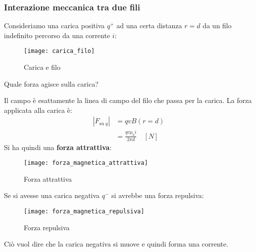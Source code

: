 \documentclass[a4paper]{article}
\begin{document}
\subsubsection{Interazione meccanica tra due fili}
\begin{example}
  Consideriamo una carica positiva \( q^+ \) ad una certa distanza \( r = d \) da un
  filo indefinito percorso da una corrente \( i \):
  \begin{figure}[H]
    \centering
    \texttt{[image: carica\_filo]}
    \caption{Carica e filo}
  \end{figure}
  \noindent
  Quale forza agisce sulla carica?

  \vspace{1em}
  \noindent
  Il campo è esattamente la linea di campo del filo che passa
  per la carica.
  La forza applicata alla carica è:
  \[
    \begin{aligned}
      |F_{\text{su }q}| &= q v B(r = d)\\
                      &= \frac{qv \mu_0 i}{2 \pi d} \quad \left[ N \right]
    \end{aligned}
  \] 
  Si ha quindi una \textbf{forza attrattiva}:
  \begin{figure}[H]
    \centering
    \texttt{[image: forza\_magnetica\_attrattiva]}
    \caption{Forza attrattiva}
  \end{figure}
  \noindent
  Se si avesse una carica negativa \( q^- \) si avrebbe una forza repulsiva:
  \begin{figure}[H]
    \centering
    \texttt{[image: forza\_magnetica\_repulsiva]}
    \caption{Forza repulsiva}
  \end{figure}
  \noindent
  Ciò vuol dire che la carica negativa si muove e quindi forma una corrente.
\end{example}
\end{document}

